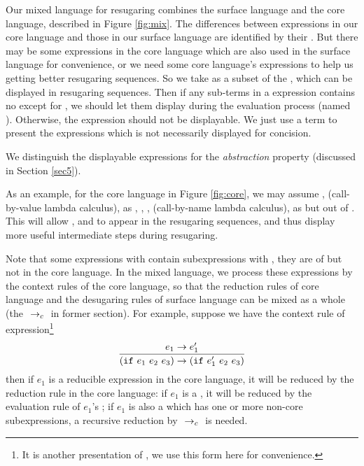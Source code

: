 Our mixed language for resugaring combines the surface language and the core language, described in Figure \ref{fig:mix}.
%
The differences between expressions in our core language and those in our surface language are identified by their . But there may be some expressions in the core language which are also used in the surface language for convenience, or we need some core language's expressions to help us getting better resugaring sequences. So we take  as a subset of the , which can be displayed in resugaring sequences. Then if any sub-terms in a expression contains no  except for , we should let them display during the evaluation process (named ). Otherwise, the expression should not be displayable. We just use a  term to present the expressions which is not necessarily displayed for concision.

We distinguish the displayable expressions for the \emph{abstraction} property (discussed in Section \ref{sec5}).


As an example, for the core language in Figure \ref{fig:core},
we may assume ,  (call-by-value lambda calculus),  as , , ,  (call-by-name lambda calculus),  as  but out of . This will allow ,  and  to appear in the resugaring sequences, and thus display more useful intermediate steps during resugaring.

Note that some expressions with  contain subexpressions with , they are of  but not in the core language. In the mixed language, we process these expressions by the context rules of the core language, so that the reduction rules of core language and the desugaring rules of surface language can be mixed as a whole (the $~\rightarrow_c~$ in former section). For example, suppose we have the context rule of  expression\footnote{It is another presentation of , we use this form here for convenience.}
\[
\infer{(\m{if}~e_1~e_2~e_3) \rightarrow (\m{if}~e_1'~e_2~e_3)}{e_1 \rightarrow e_1'}
\]
then if $e_1$ is a reducible expression in the core language, it will be reduced by the reduction rule in the core language: if $e_1$ is a , it will be reduced by the evaluation rule of $e_1$'s ; if $e_1$ is also a  which has one or more non-core subexpressions, a recursive reduction by $~\rightarrow_c~$ is needed.


